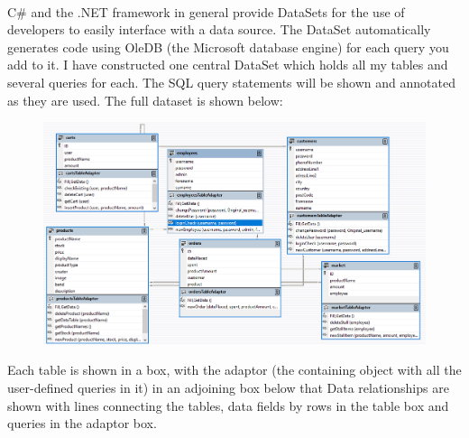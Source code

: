 ﻿\documentclass{article}
\begin{document}
    \paragraph{}
    C\# and the .NET framework in general provide DataSets for the use of developers to easily interface with a data source.
    The DataSet automatically generates code using OleDB (the Microsoft database engine) for each query you add to it.
    I have constructed one central DataSet which holds all my tables and several queries for each.
    The SQL query statements will be shown and annotated as they are used.
    The full dataset is shown below:
    \begin{figure}[h]
        \centering
        \includegraphics[width=\textwidth]{defaultDataSet.png}
    \end{figure}
    Each table is shown in a box, with the adaptor (the containing object with all the user-defined queries in it) in an adjoining box below that
    Data relationships are shown with lines connecting the tables, data fields by rows in the table box and queries in the adaptor box.
    \newpage
\end{document}
